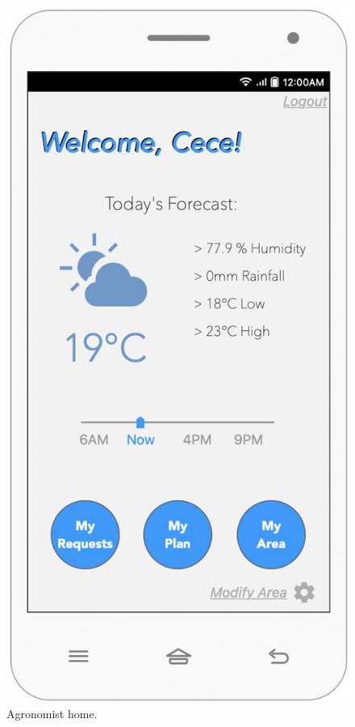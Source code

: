 \begin{multicols}{3}
\begin{figure}[H]
\centering
\includegraphics[scale=0.35]{../images_diagrams/mock_ups/welcomeagro100.png}
\caption{\label{fig:mock_agronomist}Agronomist home.}
\end{figure}


\end{multicols}
